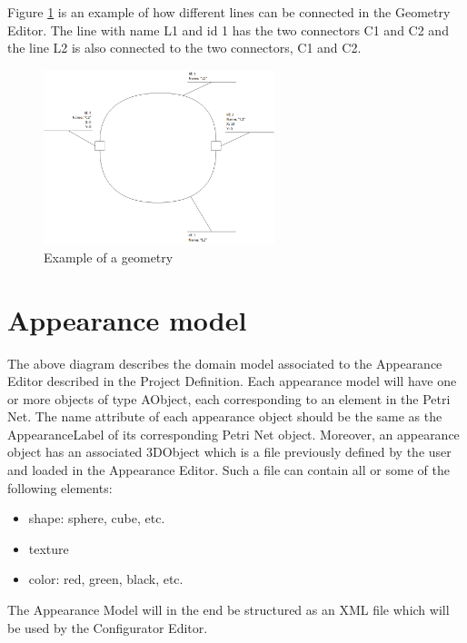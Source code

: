 \documentclass[11pt]{article}   %
\begin{document}
Figure \ref{fig:extended_petrinet_geometry} is an example of how different lines can be connected in the Geometry Editor. The line with name L1 and id 1 has the two connectors C1 and C2 and the line L2 is also connected to the two connectors, C1 and C2. 


\begin{figure}[htp]
\begin{center}
  \includegraphics[width=0.6\textwidth]{image/example_petrinet_geometry.png}
  \caption{Example of a geometry}
  \label{fig:extended_petrinet_geometry}
\end{center}
\end{figure}

\newpage
\section{Appearance model}

The above diagram describes the domain model associated to the Appearance Editor described in the Project Definition. 
Each appearance model will have one or more objects of type AObject, each corresponding to an element in the Petri Net. The name attribute of each appearance object should be the same as the AppearanceLabel of its corresponding Petri Net object. Moreover, an appearance object has an associated 3DObject which is a file previously defined by the user and loaded in the Appearance Editor. Such a file can contain all or some of the following elements: 
\begin{itemize}
\item shape: sphere, cube, etc.
\item texture
\item color: red, green, black, etc.
\end{itemize}

The Appearance Model will in the end be structured as an XML file which will be used by the Configurator Editor.    
\end{document}

